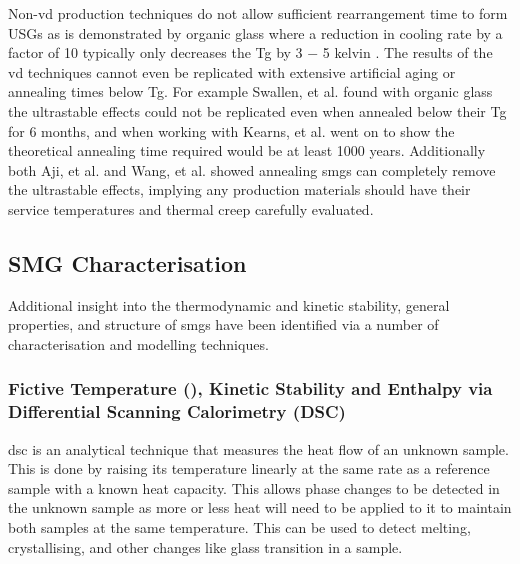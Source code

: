 \documentclass[a4paper,12pt,oneside]{report}%
\begin{document}
Non-\gls{vd} production techniques do not allow sufficient rearrangement time to form USGs as is demonstrated by organic glass where a reduction in cooling rate by a factor of 10 typically only decreases the \gls{Tg} by 3 $-$ 5 kelvin \cite{Ediger1996, Dawson2011}.  The results of the \gls{vd} techniques cannot even be replicated with extensive artificial aging or annealing times below \gls{Tg}. For example Swallen, et al. \cite{Swallen2007} found with organic glass  the ultrastable effects could not be replicated even when annealed below their \gls{Tg} for 6 months, and when working with Kearns, et al. \cite{Kearns2008} went on to show the theoretical annealing time required would be at least 1000 years. Additionally both Aji, et al. \cite{Aji2013} and Wang, et al. \cite{Wang2014} showed annealing \glspl{smg} can completely remove the ultrastable effects, implying any production materials should have their service temperatures and thermal creep carefully evaluated.

\subsection{SMG Characterisation}
Additional insight into the thermodynamic and kinetic stability, general properties, and structure of \glspl{smg} have been identified via a number of characterisation and modelling techniques. 

\subsubsection{Fictive Temperature (\Tf), Kinetic Stability and Enthalpy via Differential Scanning Calorimetry (DSC)}
\Gls{dsc} is an analytical technique that measures the heat flow of an unknown sample. This is done by raising its temperature linearly at the same rate as a reference sample with a known heat capacity. This allows phase changes to be detected in the unknown sample as more or less heat will need to be applied to it to maintain both samples at the same temperature. This can be used to detect melting, crystallising, and other changes like glass transition in a sample.
\end{document}

